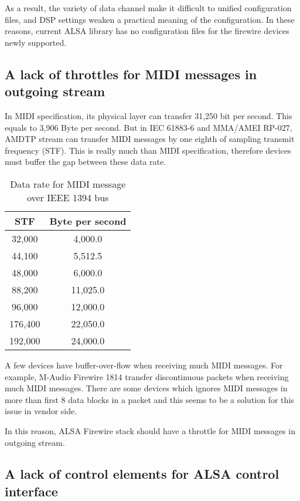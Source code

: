 \documentclass[onecolumn]{jarticle}
\begin{document}
As a result, the variety of data channel make it difficult to unified configuration files, and DSP settings weaken a practical meaning of the configuration. In these reasons, current ALSA library has no configuration files for the firewire devices newly supported.

\subsection{A lack of throttles for MIDI messages in outgoing stream}
In MIDI specification, its physical layer can transfer 31,250 bit per second. This equals to 3,906 Byte per second. But in IEC 61883-6\cite{iec61883-6-1, iec61883-6-2} and MMA/AMEI RP-027\cite{amei-rp27}, AMDTP stream can transfer MIDI messages by one eighth of sampling transmit frequency (STF). This is really much than MIDI specification, therefore devices must buffer the gap between these data rate.

\begin{table}[H]
	\centering
	\caption{{Data rate for MIDI message over IEEE 1394 bus}}
	\label{tbl:midi-rate}
	\begin{tabular}{cc} \toprule
		STF	& Byte per second \\ \midrule
		32,000	& 4,000.0	\\
		44,100	& 5,512.5	\\
		48,000	& 6,000.0	\\
		88,200	& 11,025.0	\\
		96,000	& 12,000.0	\\
		176,400	& 22,050.0	\\
		192,000	& 24,000.0	\\ \bottomrule
	\end{tabular}
\end{table}

A few devices have buffer-over-flow when receiving much MIDI messages. For example, M-Audio Firewire 1814 transfer discontinuous packets when receiving much MIDI messages. There are some devices which ignores MIDI messages in more than first 8 data blocks in a packet and this seems to be a solution for this issue in vendor side.

In this reason, ALSA Firewire stack should have a throttle for MIDI messages in outgoing stream.

\subsection{A lack of control elements for ALSA control interface}
\end{document}
